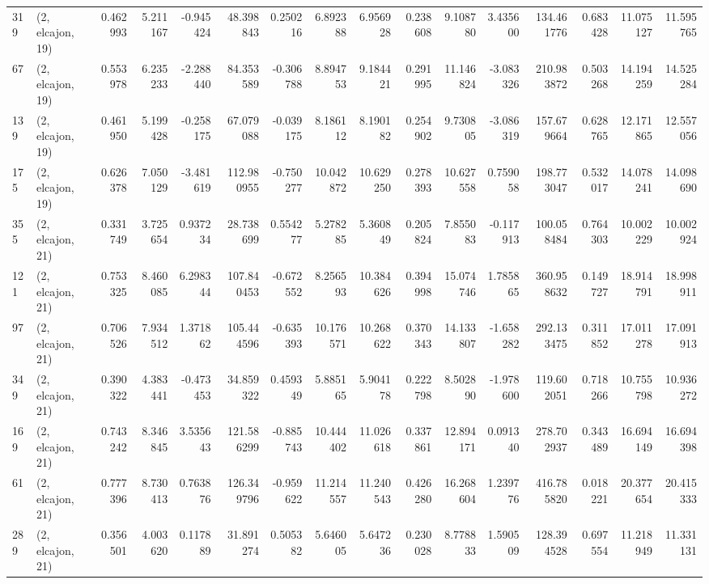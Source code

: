 \begin{tabular}{llrrrrrrrrrrrrrr}
319 &  (2, elcajon, 19) &   0.462993 &   5.211167 &  -0.945424 &    48.398843 &   0.250216 &   6.892388 &   6.956928 &  0.238608 &   9.108780 &   3.435600 &   134.461776 &  0.683428 &  11.075127 &  11.595765 \\
67  &  (2, elcajon, 19) &   0.553978 &   6.235233 &  -2.288440 &    84.353589 &  -0.306788 &   8.894753 &   9.184421 &  0.291995 &  11.146824 &  -3.083326 &   210.983872 &  0.503268 &  14.194259 &  14.525284 \\
139 &  (2, elcajon, 19) &   0.461950 &   5.199428 &  -0.258175 &    67.079088 &  -0.039175 &   8.186112 &   8.190182 &  0.254902 &   9.730805 &  -3.086319 &   157.679664 &  0.628765 &  12.171865 &  12.557056 \\
175 &  (2, elcajon, 19) &   0.626378 &   7.050129 &  -3.481619 &   112.980955 &  -0.750277 &  10.042872 &  10.629250 &  0.278393 &  10.627558 &   0.759058 &   198.773047 &  0.532017 &  14.078241 &  14.098690 \\
355 &  (2, elcajon, 21) &   0.331749 &   3.725654 &   0.937234 &    28.738699 &   0.554277 &   5.278285 &   5.360849 &  0.205824 &   7.855083 &  -0.117913 &   100.058484 &  0.764303 &  10.002229 &  10.002924 \\
121 &  (2, elcajon, 21) &   0.753325 &   8.460085 &   6.298344 &   107.840453 &  -0.672552 &   8.256593 &  10.384626 &  0.394998 &  15.074746 &   1.785865 &   360.958632 &  0.149727 &  18.914791 &  18.998911 \\
97  &  (2, elcajon, 21) &   0.706526 &   7.934512 &   1.371862 &   105.444596 &  -0.635393 &  10.176571 &  10.268622 &  0.370343 &  14.133807 &  -1.658282 &   292.133475 &  0.311852 &  17.011278 &  17.091913 \\
349 &  (2, elcajon, 21) &   0.390322 &   4.383441 &  -0.473453 &    34.859322 &   0.459349 &   5.885165 &   5.904178 &  0.222798 &   8.502890 &  -1.978600 &   119.602051 &  0.718266 &  10.755798 &  10.936272 \\
169 &  (2, elcajon, 21) &   0.743242 &   8.346845 &   3.535643 &   121.586299 &  -0.885743 &  10.444402 &  11.026618 &  0.337861 &  12.894171 &   0.091340 &   278.702937 &  0.343489 &  16.694149 &  16.694398 \\
61  &  (2, elcajon, 21) &   0.777396 &   8.730413 &   0.763876 &   126.349796 &  -0.959622 &  11.214557 &  11.240543 &  0.426280 &  16.268604 &   1.239776 &   416.785820 &  0.018221 &  20.377654 &  20.415333 \\
289 &  (2, elcajon, 21) &   0.356501 &   4.003620 &   0.117889 &    31.891274 &   0.505382 &   5.646005 &   5.647236 &  0.230028 &   8.778833 &   1.590509 &   128.394528 &  0.697554 &  11.218949 &  11.331131 \\

\end{tabular}
